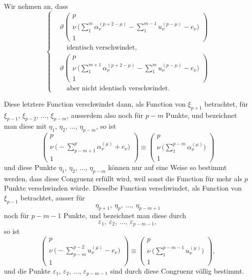 \documentclass[12pt,a4paper]{book}
\theoremstyle{definition}
\theoremstyle{remark}
\begin{document}
Wir nehmen an, dass
\begin{equation}
\tag{1}
\left\{
\begin{aligned}
&\vartheta\left(\begin{array}{c} p\\ \nu\ \bigl(\sum\limits_1^m \alpha_\nu^{(p+2-\mu)} - \sum\limits_1^{m-1} u_\nu^{(p-\mu)} - e_\nu\bigr)\\ 1 \end{array}\right)\\
&\quad\text{identisch verschwindet,}\\
&\vartheta\left(\begin{array}{c} p\\ \nu\ \bigl(\sum\limits_1^{m+1} \alpha_\nu^{(p+2-\mu)} - \sum\limits_1^m u_\nu^{(p-\mu)} - e_\nu\bigr)\\ 1 \end{array}\right)\\
&\quad\text{aber nicht identisch verschwindet.}
\end{aligned}
\right.
\end{equation}

Diese letztere Function verschwindet dann, als Function von $\xi_{p+1}$ betrachtet, für $\xi_{p-1}$, $\xi_{p-2}$, $\ldots$, $\xi_{p-m}$, ausserdem also noch für $p-m$ Punkte, und bezeichnet man diese mit $\eta_1$, $\eta_2$, $\ldots$, $\eta_{p-m}$, so ist
\[ \left(\begin{array}{c} p\\ \nu\ \bigl(-\sum\limits_{p-m+1}^p \alpha_\nu^{(\mu)} + e_\nu\bigr)\\ 1 \end{array}\right) \equiv \left(\begin{array}{c} p\\ \nu\ \bigl(\sum\limits_1^{p-m} \alpha_\nu^{(\mu)}\bigr)\\ 1 \end{array}\right) \]
und diese Punkte $\eta_1$, $\eta_2$, $\ldots$, $\eta_{p-m}$ können nur auf eine Weise so bestimmt werden, dass diese Congruenz erfüllt wird, weil sonst die Function für mehr als $p$ Punkte verschwinden würde. Dieselbe Function verschwindet, als Function von $\xi_{p-1}$ betrachtet, ausser für
\[ \eta_{p+1},\ \eta_p,\ \ldots,\ \eta_{p-m+1} \]
noch für $p-m-1$ Punkte, und bezeichnet man diese durch
\[ \varepsilon_1,\ \varepsilon_2,\ \ldots,\ \varepsilon_{p-m-1}, \]
so ist
\[ \left(\begin{array}{c} p\\ \nu\ \bigl(-\sum\limits_{p-m}^{p-2} u_\nu^{(\mu)} - e_\nu\bigr)\\ 1 \end{array}\right) \equiv \left(\begin{array}{c} p\\ \nu\ \bigl(\sum\limits_1^{p-m-1} u_\nu^{(\mu)}\bigr)\\ 1 \end{array}\right), \]
und die Punkte $\varepsilon_1$, $\varepsilon_2$, $\ldots$, $\varepsilon_{p-m-1}$ sind durch diese Congruenz völlig bestimmt.
\end{document}
